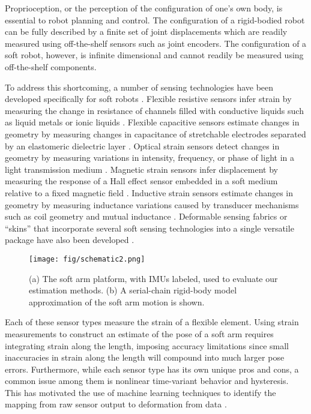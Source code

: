 
Proprioception, or the perception of the configuration of one's own body, is essential to robot planning and control.
The configuration of a rigid-bodied robot can be fully described by a finite set of joint displacements which are readily measured using off-the-shelf sensors such as joint encoders.
The configuration of a soft robot, however, is infinite dimensional and cannot readily be measured using off-the-shelf components.

To address this shortcoming, a number of sensing technologies have been developed specifically for soft robots \cite{wang2018toward}.
Flexible resistive sensors infer strain by measuring the change in resistance of channels filled with conductive liquids such as liquid metals \cite{park2012design, muth2014embedded} or ionic liquids \cite{helps2018proprioceptive}.
Flexible capacitive sensors estimate changes in geometry by measuring changes in capacitance of stretchable electrodes separated by an elastomeric dielectric layer \cite{yuen2018_strain}.
Optical strain sensors detect changes in geometry by measuring variations in intensity, frequency, or phase of light in a light transmission medium \cite{galloway2019_fiberopt, ZHUANG20187, zhao2016helping, van2018soft}.
Magnetic strain sensors infer displacement by measuring the response of a Hall effect sensor embedded in a soft medium relative to a fixed magnetic field \cite{luo2017_magnet, ozel2015precise}.
Inductive strain sensors estimate changes in geometry by measuring inductance variations caused by transducer mechanisms such as coil geometry and mutual inductance \cite{felt2015contraction, lazarus2018bubble, felt2019inductance}.
Deformable sensing fabrics or ``skins'' that incorporate several soft sensing technologies into a single versatile package have also been developed \cite{case2018_fabrics, Yuen2017_fabric}.

\begin{figure}
    \centering
    \texttt{[image: fig/schematic2.png]}
    \caption{(a) The soft arm platform, with IMUs labeled, used to evaluate our estimation methods. (b) A serial-chain rigid-body model approximation of the soft arm motion is shown.}
    \label{fig:schematic}
\end{figure}

Each of these sensor types measure the strain of a flexible element.
Using strain measurements to construct an estimate of the pose of a soft arm requires integrating strain along the length, imposing accuracy limitations since small inaccuracies in strain along the length will compound into much larger pose errors.
Furthermore, while each sensor type has its own unique pros and cons, a common issue among them is nonlinear time-variant behavior and hysteresis.
This has motivated the use of machine learning techniques to identify the mapping from raw sensor output to deformation from data \cite{tapia2020_makesense, truby2020_piezo, thuruthel2019soft}.


